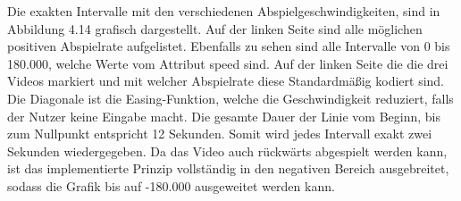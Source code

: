 \documentclass[11pt,a4paper]{report}
\begin{document}
Die exakten Intervalle mit den verschiedenen Abspielgeschwindigkeiten, sind in Abbildung 4.14 grafisch dargestellt. Auf der linken Seite sind alle möglichen positiven Abspielrate aufgelistet. Ebenfalls zu sehen sind alle Intervalle von 0 bis 180.000, welche Werte vom Attribut speed sind. Auf der linken Seite die die drei Videos markiert und mit welcher Abspielrate diese Standardmäßig kodiert sind. Die Diagonale ist die Easing-Funktion, welche die Geschwindigkeit reduziert, falls der Nutzer keine Eingabe macht. Die gesamte Dauer der Linie vom Beginn, bis zum Nullpunkt entspricht 12 Sekunden. Somit wird jedes Intervall exakt zwei Sekunden wiedergegeben. Da das Video auch rückwärts abgespielt werden kann, ist das implementierte Prinzip vollständig in den negativen Bereich ausgebreitet, sodass die Grafik bis auf -180.000 ausgeweitet werden kann.
\end{document}
